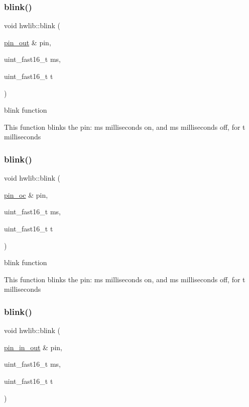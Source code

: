 \subsubsection{\texorpdfstring{blink()}{blink()}\hspace{0.1cm}{\footnotesize\ttfamily [4/6]}}
{\footnotesize\ttfamily void hwlib\+::blink (\begin{DoxyParamCaption}\item[{\hyperlink{classhwlib_1_1pin__out}{pin\+\_\+out} \&}]{pin,  }\item[{uint\+\_\+fast16\+\_\+t}]{ms,  }\item[{uint\+\_\+fast16\+\_\+t}]{t }\end{DoxyParamCaption})}

blink function

This function blinks the pin\+: ms milliseconds on, and ms milliseconds off, for t milliseconds \mbox{\label{namespacehwlib_a15c7dfa69658f68b4c264274f88cfa07}} 
\subsubsection{\texorpdfstring{blink()}{blink()}\hspace{0.1cm}{\footnotesize\ttfamily [5/6]}}
{\footnotesize\ttfamily void hwlib\+::blink (\begin{DoxyParamCaption}\item[{\hyperlink{classhwlib_1_1pin__oc}{pin\+\_\+oc} \&}]{pin,  }\item[{uint\+\_\+fast16\+\_\+t}]{ms,  }\item[{uint\+\_\+fast16\+\_\+t}]{t }\end{DoxyParamCaption})}





blink function

This function blinks the pin\+: ms milliseconds on, and ms milliseconds off, for t milliseconds \mbox{\label{namespacehwlib_a7a664ac66df071c75f502006e184101c}} 
\subsubsection{\texorpdfstring{blink()}{blink()}\hspace{0.1cm}{\footnotesize\ttfamily [6/6]}}
{\footnotesize\ttfamily void hwlib\+::blink (\begin{DoxyParamCaption}\item[{\hyperlink{classhwlib_1_1pin__in__out}{pin\+\_\+in\+\_\+out} \&}]{pin,  }\item[{uint\+\_\+fast16\+\_\+t}]{ms,  }\item[{uint\+\_\+fast16\+\_\+t}]{t }\end{DoxyParamCaption})}





